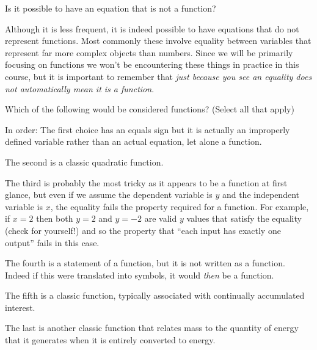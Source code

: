 \documentclass{ximera}
\begin{document}
\begin{problem}
    Is it possible to have an equation that is not a function?
    \begin{multipleChoice}
    \end{multipleChoice}
    \begin{feedback}
        Although it is less frequent, it is indeed possible to have equations that do not represent functions. Most commonly these involve equality between variables that represent far more complex objects than numbers. Since we will be primarily focusing on functions we won't be encountering these things in practice in this course, but it is important to remember that \textit{just because you see an equality does not automatically mean it is a function}.
    \end{feedback}
\end{problem}
\begin{problem}
    Which of the following would be considered functions? (Select all that apply)
    \begin{selectAll}
    \end{selectAll}
    \begin{feedback}
        In order: The first choice has an equals sign but it is actually an improperly defined variable rather than an actual equation, let alone a function.
        
        The second is a classic quadratic function.
        
        The third is probably the most tricky as it appears to be a function at first glance, but even if we assume the dependent variable is $y$ and the independent variable is $x$, the equality fails the property required for a function. For example, if $x=2$ then both $y=2$ and $y=-2$ are valid $y$ values that satisfy the equality (check for yourself!) and so the property that ``each input has exactly one output'' fails in this case.
        
        The fourth is a statement of a function, but it is not written as a function. Indeed if this were translated into symbols, it would \textit{then} be a function.
        
        The fifth is a classic function, typically associated with continually accumulated interest.
        
        The last is another classic function that relates mass to the quantity of energy that it generates when it is entirely converted to energy.
    \end{feedback}
\end{problem}
\end{document}
